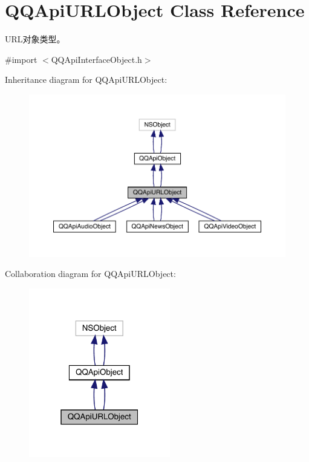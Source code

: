 \hypertarget{interface_q_q_api_u_r_l_object}{}\section{Q\+Q\+Api\+U\+R\+L\+Object Class Reference}
\label{interface_q_q_api_u_r_l_object}


U\+R\+L对象类型。  




{\ttfamily \#import $<$Q\+Q\+Api\+Interface\+Object.\+h$>$}



Inheritance diagram for Q\+Q\+Api\+U\+R\+L\+Object\+:\nopagebreak
\begin{figure}[H]
\begin{center}
\leavevmode
\includegraphics[width=350pt]{interface_q_q_api_u_r_l_object__inherit__graph}
\end{center}
\end{figure}


Collaboration diagram for Q\+Q\+Api\+U\+R\+L\+Object\+:\nopagebreak
\begin{figure}[H]
\begin{center}
\leavevmode
\includegraphics[width=175pt]{interface_q_q_api_u_r_l_object__coll__graph}
\end{center}
\end{figure}
